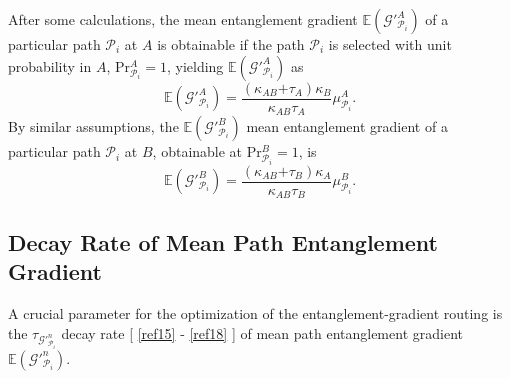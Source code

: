 \documentclass[11pt]{article}%
\newcommand*{\cref}[1]{%
  \begingroup
    \hypersetup{
      linkcolor=linkequation,
      linkbordercolor=linkequation,
    }%
    \ref{#1}%
  \endgroup
}
\begin{document}
 After some calculations, the mean entanglement gradient $\mathbb{E}\left({\mathcal{G}}'^A_{{\mathcal{P}}_i}\right)$ of a particular path ${\mathcal{P}}_i$ at $A$ is obtainable if the path ${\mathcal{P}}_i$ is selected with unit probability in $A$, $\mathrm{P}{\mathrm{r}}^A_{{\mathcal{P}}_i}\mathrm{=1}$, yielding $\mathbb{E}\left({\mathcal{G}}'^A_{{\mathcal{P}}_i}\right)$ as
\begin{equation} \label{ZEqnNum406725} 
\mathbb{E}\left({\mathcal{G}}'^A_{{\mathcal{P}}_i}\right)\mathrm{=}\frac{\left({\kappa }_{AB}\mathrm{+}{\tau }_A\right){\kappa }_B}{{\kappa }_{AB}{\tau }_A}{\mu }^A_{{\mathcal{P}}_i}.                                                                           
\end{equation} 
By similar assumptions, the $\mathbb{E}\left({\mathcal{G}}'^B_{{\mathcal{P}}_i}\right)$ mean entanglement gradient of a particular path ${\mathcal{P}}_i$ at $B$, obtainable at $\mathrm{P}{\mathrm{r}}^B_{{\mathcal{P}}_i}\mathrm{=1}$, is
\begin{equation} \label{ZEqnNum485557} 
\mathbb{E}\left({\mathcal{G}}'^B_{{\mathcal{P}}_i}\right)\mathrm{=}\frac{\left({\kappa }_{AB}\mathrm{+}{\tau }_B\right){\kappa }_A}{{\kappa }_{AB}{\tau }_B}{\mu }^B_{{\mathcal{P}}_i}.                                                                         
\end{equation} 

 
\subsection{Decay Rate of Mean Path Entanglement Gradient}

 A crucial parameter for the optimization of the entanglement-gradient routing is the ${\tau }_{{\mathcal{G}}'^n_{{\mathcal{P}}_i}}$ decay rate [\cref{ref15}-\cref{ref18}] of mean path entanglement gradient $\mathbb{E}\left({\mathcal{G}}'^n_{{\mathcal{P}}_i}\right)$. 
\end{document}
